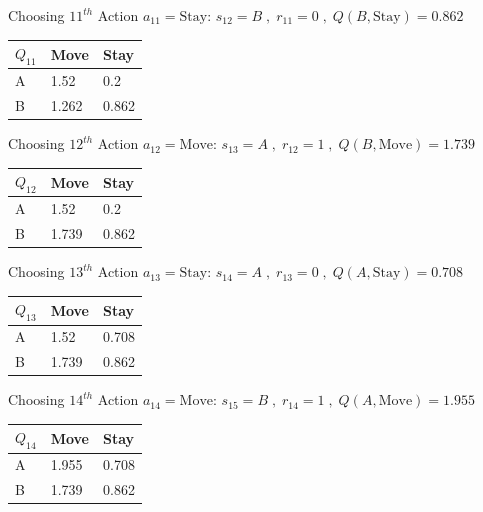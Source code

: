 \documentclass[a4paper]{article}
\theoremstyle{definition}
\newenvironment{soln}{
    \leavevmode\color{blue}\ignorespaces
}{}
\begin{document}
\begin{enumerate}
\begin{soln}
Choosing $11^{th}$ Action $a_{11} = \text{Stay}$: $s_{12}=B\;,\;r_{11}=0\;,\;Q(B,\text{Stay}) = 0.862$
        \begin{center}
            \begin{tabular}{ | m{5em} | m{5em}| m{5em} |} 
            \hline
            $Q_{11}$ & Move & Stay \\ 
            \hline
            A & 1.52 & 0.2  \\
            \hline
            B & 1.262 & 0.862 \\ 
            \hline
            \end{tabular}
        \end{center}
Choosing $12^{th}$ Action $a_{12} = \text{Move}$: $s_{13}=A\;,\;r_{12}=1\;,\;Q(B,\text{Move}) = 1.739$
        \begin{center}
            \begin{tabular}{ | m{5em} | m{5em}| m{5em} |} 
            \hline
            $Q_{12}$ & Move & Stay \\ 
            \hline
            A & 1.52 & 0.2  \\
            \hline
            B & 1.739 & 0.862 \\ 
            \hline
            \end{tabular}
        \end{center}
Choosing $13^{th}$ Action $a_{13} = \text{Stay}$: $s_{14}=A\;,\;r_{13}=0\;,\;Q(A,\text{Stay}) = 0.708$
        \begin{center}
            \begin{tabular}{ | m{5em} | m{5em}| m{5em} |} 
            \hline
            $Q_{13}$ & Move & Stay \\ 
            \hline
            A & 1.52 & 0.708  \\
            \hline
            B & 1.739 & 0.862 \\ 
            \hline
            \end{tabular}
        \end{center}
Choosing $14^{th}$ Action $a_{14} = \text{Move}$: $s_{15}=B\;,\;r_{14}=1\;,\;Q(A,\text{Move}) = 1.955$
        \begin{center}
            \begin{tabular}{ | m{5em} | m{5em}| m{5em} |} 
            \hline
            $Q_{14}$ & Move & Stay \\ 
            \hline
            A & 1.955 & 0.708  \\
            \hline
            B & 1.739 & 0.862 \\ 

\end{tabular}
\end{center}
\end{soln}
\end{enumerate}
\end{document}
